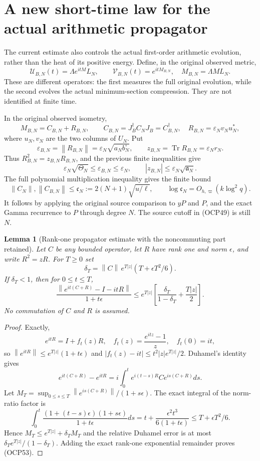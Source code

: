 \documentclass[11pt]{article}
\newtheorem{lemma}[theorem]{Lemma}
\newcommand{\tr}{\operatorname{Tr}}
\newcommand{\eps}{\varepsilon}
\newcommand{\norm}[1]{\left\lVert#1\right\rVert}
\begin{document}
\section{A new short-time law for the actual arithmetic propagator}
The current estimate also controls the actual first-order arithmetic evolution, rather than the heat of its positive energy. Define, in the original observed metric,
\[
 \mathscr U_{B,N}(t)=\Lambda e^{itM}L_N,
 \qquad \mathscr V_{B,N}(t)=e^{itM_{B,N}},
 \quad M_{B,N}=\Lambda ML_N.
 \tag{OCP49}
\]
These are different operators: the first measures the full original evolution, while the second evolves the actual minimum-section compression. They are not identified at finite time.

In the original observed isometry,
\[
 M_{B,N}=C_{B,N}+R_{B,N},\qquad
 C_{B,N}=J_B^\dagger C_NJ_B=C_{B,N}^\dagger,
 \quad R_{B,N}=\eps_N v_Nu_N^*,
\]
where $u_N,v_N$ are the two columns of $U_N$. Put
\[
 \eps_{B,N}=\norm{R_{B,N}}
 =\eps_N\sqrt{a_Nb_N^{\circ}},\qquad
 z_{B,N}=\tr R_{B,N}=\eps_Nr_N.
 \tag{OCP50}
\]
Thus $R_{B,N}^2=z_{B,N}R_{B,N}$, and the previous finite inequalities give
\[
 \eps_N\sqrt{\Theta_N}\le\eps_{B,N}\le\eps_N,
 \qquad |z_{B,N}|\le\eps_N\sqrt{\mathfrak a_N}.
 \tag{OCP51}
\]
The full polynomial multiplication inequality gives the finite bound
\[
 \norm{C_N},\norm{C_{B,N}}\le
 \mathfrak c_N:=2(N+1)\sqrt{u/\ell},\qquad
 \log\mathfrak c_N=O_{h,\varpi}(k\log^2q).
 \tag{OCP52}
\]
It follows by applying the original source comparison to $yP$ and $P$, and the exact Gamma recurrence to $P$ through degree $N$. The source cutoff in (OCP49) is still $N$.

\begin{lemma}[Rank-one propagator estimate with the noncommuting part retained]
Let $C$ be any bounded operator, let $R$ have rank one and norm $\epsilon$, and write $R^2=zR$. For $T\ge0$ set
\[
 \delta_T=\norm C\,e^{T|z|}(T+\epsilon T^2/6).
\]
If $\delta_T<1$, then for $0\le t\le T$,
\[
 \boxed{
 \frac{\norm{e^{it(C+R)}-I-itR}}{1+t\epsilon}
 \le e^{T|z|}\left[
 \frac{\delta_T}{1-\delta_T}+\frac{T|z|}{2}\right].}
 \tag{OCP53}
\]
No commutation of $C$ and $R$ is assumed.
\end{lemma}
\begin{proof}
Exactly,
\[
 e^{itR}=I+f_t(z)R,\quad
 f_t(z)=\frac{e^{itz}-1}{z},\quad f_t(0)=it,
\]
so $\norm{e^{itR}}\le e^{T|z|}(1+t\epsilon)$ and
$|f_t(z)-it|\le t^2|z|e^{T|z|}/2$.
Duhamel's identity gives
\[
 e^{it(C+R)}-e^{itR}
 =i\int_0^t e^{i(t-s)R}C e^{is(C+R)}ds.
\]
Let $M_T=\sup_{0\le s\le T}\norm{e^{is(C+R)}}/(1+s\epsilon)$. The exact integral of the norm-ratio factor is
\[
 \int_0^t\frac{(1+(t-s)\epsilon)(1+s\epsilon)}{1+t\epsilon}ds
 =t+\frac{\epsilon^2t^3}{6(1+t\epsilon)}
 \le T+\epsilon T^2/6.
\]
Hence $M_T\le e^{T|z|}+\delta_TM_T$ and the relative Duhamel error is at most $\delta_Te^{T|z|}/(1-\delta_T)$. Adding the exact rank-one exponential remainder proves (OCP53).
\end{proof}
\end{document}
